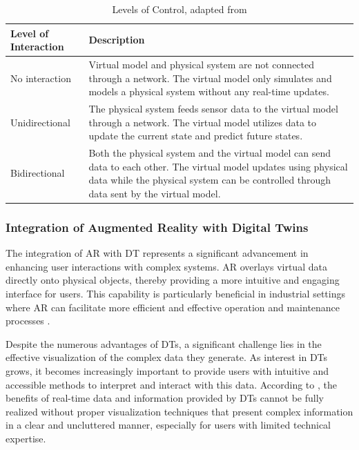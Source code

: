 \begin{table}[!htpb]
    \centering
    \caption{Levels of Control, adapted from \cite{liu2022state}}
    \label{tab:levels_of_control}
    \begin{tabular}{@{}l>{\raggedright\arraybackslash}p{10cm}@{}}
    \toprule
    Level of Interaction & Description \\ 
    \midrule
    No interaction & Virtual model and physical system are not connected through a network. The virtual model only simulates and models a physical 
    system without any real-time updates. \\ \hline
    Unidirectional & The physical system feeds sensor data to the virtual model through a network. The virtual model utilizes data to update the 
    current state and predict future states. \\ \hline
    Bidirectional & Both the physical system and the virtual model can send data to each other. The virtual model updates using physical data while 
    the physical system can be controlled through data sent by the virtual model. \\ 
    \bottomrule
    \end{tabular}
\end{table}



\subsubsection{Integration of Augmented Reality with Digital Twins} %
The integration of \ac{AR} with \ac{DT} represents a significant advancement in enhancing user interactions with complex systems. 
\ac{AR} overlays virtual data directly onto physical objects, thereby providing a more intuitive and engaging interface for users. 
This capability is particularly beneficial in industrial settings where \ac{AR} can facilitate more efficient and effective operation and 
maintenance processes \cite{article12, peddie2017augmented}.

Despite the numerous advantages of \ac{DT}s, a significant challenge lies in the effective visualization of the complex data they generate. 
As interest in \ac{DT}s grows, it becomes increasingly important to provide users with intuitive and accessible methods to interpret and interact 
with this data. According to \cite{article12}, the benefits of real-time data and information provided by \ac{DT}s cannot be fully realized without 
proper visualization techniques that present complex information in a clear and uncluttered manner, especially for users with limited technical expertise.

